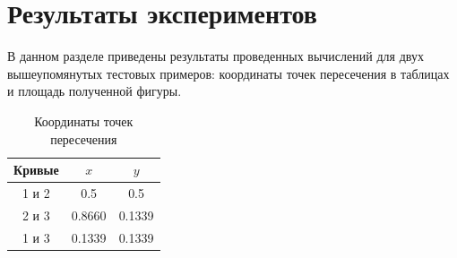 \documentclass[a4paper,12pt,titlepage,finall]{article}
\begin{document}
\newpage

\section{Результаты экспериментов}

В данном разделе приведены результаты проведенных вычислений для двух вышеупомянутых тестовых примеров:
координаты точек пересечения в таблицах и площадь полученной фигуры.

\begin{table}[h]
\centering
\begin{tabular}{|c|c|c|}
\hline
Кривые & $x$ & $y$ \\
\hline
1 и 2 &  0.5 & 0.5 \\
2 и 3 &  0.8660 & 0.1339 \\
1 и 3 & 0.1339 & 0.1339 \\
\hline
\end{tabular}
\caption{Координаты точек пересечения}
\label{table1}
\end{table}
\end{document}
